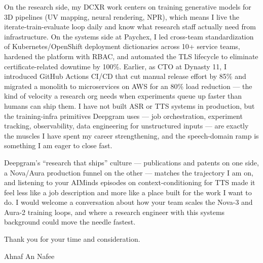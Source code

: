 \documentclass[letterpaper,11pt]{article}
\begin{document}
On the research side, my DCXR work centers on training generative models for 3D pipelines (UV mapping, neural rendering, NPR), which means I live the iterate-train-evaluate loop daily and know what research staff actually need from infrastructure. On the systems side at Paychex, I led cross-team standardization of Kubernetes/OpenShift deployment dictionaries across 10+ service teams, hardened the platform with RBAC, and automated the TLS lifecycle to eliminate certificate-related downtime by 100\%. Earlier, as CTO at Dynasty 11, I introduced GitHub Actions CI/CD that cut manual release effort by 85\% and migrated a monolith to microservices on AWS for an 80\% load reduction --- the kind of velocity a research org needs when experiments queue up faster than humans can ship them. I have not built ASR or TTS systems in production, but the training-infra primitives Deepgram uses --- job orchestration, experiment tracking, observability, data engineering for unstructured inputs --- are exactly the muscles I have spent my career strengthening, and the speech-domain ramp is something I am eager to close fast.

Deepgram's ``research that ships'' culture --- publications and patents on one side, a Nova/Aura production funnel on the other --- matches the trajectory I am on, and listening to your AIMinds episodes on context-conditioning for TTS made it feel less like a job description and more like a place built for the work I want to do. I would welcome a conversation about how your team scales the Nova-3 and Aura-2 training loops, and where a research engineer with this systems background could move the needle fastest.

Thank you for your time and consideration.

\vspace{18pt}
Ahnaf An Nafee
\end{document}
